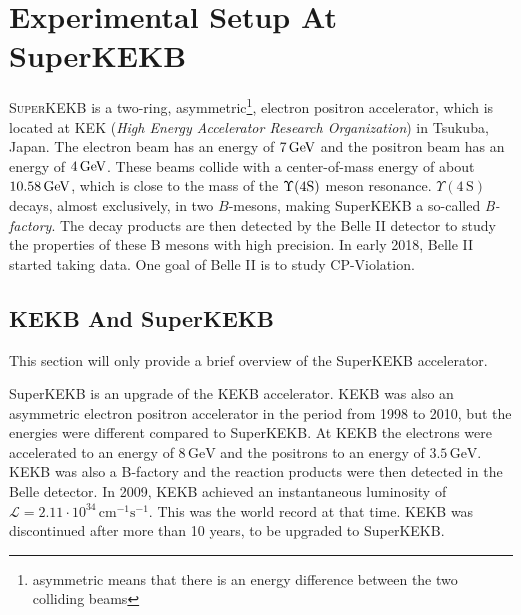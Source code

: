 \documentclass[a4paper,11pt,twosided,final,german,openbib,pdftex,listof=totoc,bibliography=totoc]{scrbook}
\begin{document}
\chapter{Experimental Setup At SuperKEKB}
\label{sec:SetupKEK}

\lettrine{S}{uperKEKB} is a two-ring, asymmetric\footnote{asymmetric means that there is an energy difference between the two colliding beams}, electron positron accelerator, which is located at KEK (\textit{High Energy Accelerator Research Organization}) in Tsukuba, Japan. 
The electron beam has an energy of $7\,\textnormal{GeV}$ and the positron beam has an energy of $4\,\textnormal{GeV}$. These beams collide with a center-of-mass energy of about $10.58\,\textnormal{GeV}$, which is close to the mass of the $\Upsilon(4\textnormal{S})$ meson resonance. $\Upsilon(4\,\textrm{S})$ decays, almost exclusively, in two $B$-mesons, making SuperKEKB a so-called \textit{B-factory}. The decay products are then detected by the Belle II detector to study the properties of these B mesons with high precision. In early 2018, Belle II started taking data. One goal of Belle II is to study CP-Violation.\cite{B2B}

\section{KEKB And SuperKEKB}
\label{sec:KEK}


This section will only provide a brief overview of the SuperKEKB accelerator.

SuperKEKB is an upgrade of the KEKB accelerator. KEKB was also an asymmetric electron positron accelerator in the period from 1998 to 2010, but the energies were different compared to SuperKEKB. At KEKB the electrons were accelerated to an energy of $8\,\textrm{GeV}$ and the positrons to an energy of $3.5\,\textrm{GeV}$. KEKB was also a B-factory and the reaction products were then detected in the Belle detector. In 2009, KEKB achieved an instantaneous luminosity of $\mathcal{L} = 2.11 \cdot 10^{34}\,\textrm{cm}^{-1}\textrm{s}^{-1}$. This was the world record at that time. KEKB was discontinued after more than 10 years, to be upgraded to SuperKEKB.\cite{PTEP}
\end{document}
